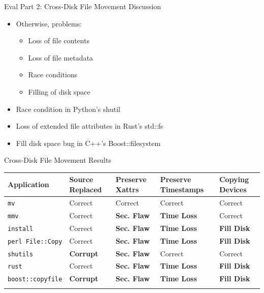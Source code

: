 \documentclass[pdf]{beamer}
\begin{document}
\begin{frame}{Eval Part 2: Cross-Disk File Movement Discussion}
    \begin{itemize}
    \item{Otherwise, problems:}
      \begin{itemize}
        \item{Loss of file contents}
        \item{Loss of file metadata}
        \item{Race conditions}
        \item{Filling of disk space}
      \end{itemize}
    \item{Race condition in Python's shutil}
    \item{Loss of extended file attributes in Rust's std::fs}
    \item{Fill disk space bug in C++'s Boost::filesystem}
  \end{itemize}
\end{frame}


\begin{frame}{Cross-Disk File Movement Results}
 \begin{table}[t]
    \scriptsize{}
    \begin{tabular}{l p{1cm} p{1cm} p{1.2cm} p{1cm}}
    \toprule{}
        Application     & Source Replaced & Preserve Xattrs & Preserve Timestamps & Copying Devices\\
\hline
        {\tt mv}              & Correct             & Correct         & Correct             & Correct\\
        {\tt mmv}             & Correct             & {\bf Sec. Flaw} & {\bf Time Loss} & Correct\\
        {\tt install}         & Correct             & {\bf Sec. Flaw} & {\bf Time Loss} & {\bf Fill Disk} \\
        {\tt perl File::Copy} & Correct             & {\bf Sec. Flaw} & {\bf Time Loss} & {\bf Fill Disk} \\
        {\tt shutils}         & {\bf Corrupt}	& {\bf Sec. Flaw} 	& Correct             & Correct\\
        {\tt rust}             & Correct             & {\bf Sec. Flaw} & {\bf Time Loss} & {\bf Fill Disk} \\
        {\tt boost::copyfile} & {\bf Corrupt}	      & {\bf Sec. Flaw} & {\bf Time Loss} & {\bf Fill Disk} \\
    \bottomrule{}
    \end{tabular}
\end{table}
\end{frame}
\end{document}
